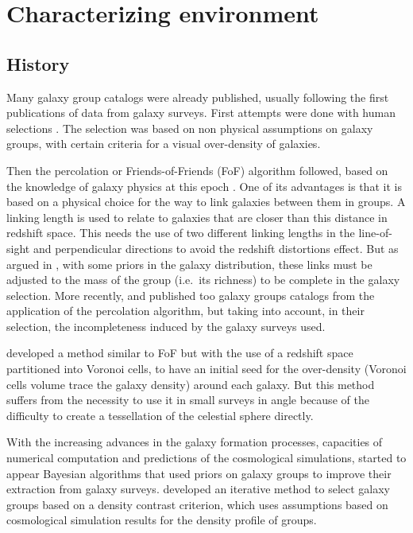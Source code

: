 \section{Characterizing environment}
\label{sec:characterizing_environment}

\subsection{History}
\label{sub:history}

Many galaxy group catalogs were already published, usually following the first
publications of data from galaxy surveys. First attempts were done with human
selections \citep{Abell+58,Zwicky+61,Rose+76}. The selection was based on non
physical assumptions on galaxy groups, with certain criteria for a visual
over-density of galaxies.

Then the percolation or Friends-of-Friends (FoF) algorithm followed, based on
the knowledge of galaxy physics at this epoch \citep{Huchra+82,Nolthenius+87}.
One of its advantages is that it is based on a physical choice for the way to
link galaxies between them in groups. A linking length is used to relate to
galaxies that are closer than this distance in redshift space. This needs the
use of two different linking lengths in the line-of-sight and perpendicular
directions to avoid the redshift distortions effect. But as argued in
\citet{DM+14a}, with some priors in the galaxy distribution, these links must
be adjusted to the mass of the group (i.e.\ its richness) to be complete in the
galaxy selection. More recently, \citet{Eke+04} and \citet{Berlind+06}
published too galaxy groups catalogs from the application of the percolation
algorithm, but taking into account, in their selection, the incompleteness
induced by the galaxy surveys used.

\citet{Marinoni+02} developed a method similar to FoF but with the use of a
redshift space partitioned into Voronoi cells, to have an initial seed for the
over-density (Voronoi cells volume trace the galaxy density) around each
galaxy. But this method suffers from the necessity to use it in small surveys
in angle because of the difficulty to create a tessellation of the celestial
sphere directly.

With the increasing advances in the galaxy formation processes, capacities of
numerical computation and predictions of the cosmological simulations, started
to appear Bayesian algorithms that used priors on galaxy groups to improve
their extraction from galaxy surveys. \citet{Yang+05,Yang+07} developed an
iterative method to select galaxy groups based on a density contrast criterion,
which uses assumptions based on cosmological simulation results for the density
profile of groups.

